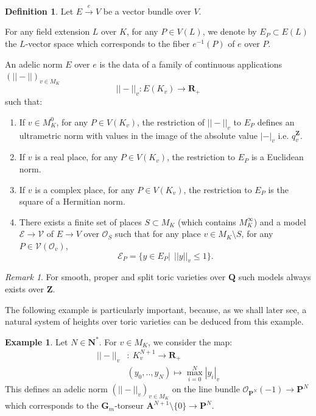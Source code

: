 \documentclass{proc-l}
\newcommand{\R}{\mathbf{R}}
\newcommand{\Z}{\mathbf{Z}}
\newcommand{\Proj}{\mathbf{P}}
\newcommand{\N}{\mathbf{N}}
\newcommand{\Q}{\mathbf{Q}}
\newcommand{\G}{\mathbf{G}}
\newcommand{\affine}{\mathbf{A}}
\newcommand{\sheafO}{\mathcal{O}}
\theoremstyle{definition}
\newtheorem{definition}[theorem]{Definition}
\newtheorem{example}[theorem]{Example}
\theoremstyle{remark}
\newtheorem{remark}[theorem]{Remark}
\numberwithin{equation}{section}
\begin{document}
\begin{definition}
    Let $E \xrightarrow{e} V$ be a vector bundle over $V$.

   For any field extension $L$ over $K$, for any $P \in V(L)$, we denote by $E_P \subset E(L)$ the $L$-vector space which corresponds to the fiber $e^{-1}(P)$ of $e$ over $P$.
   
   An adelic norm $E$ over $e$ is the data of a family of continuous applications $(||-|| )_{v \in M_K}$ 
   $$ ||-||_v : E(K_v) \rightarrow \R_+$$
   such that:
\begin{enumerate}
    \item If $v \in M_K^0$, for any $P \in V(K_v)$, the restriction of $||-||_v$ to $E_P$ defines an ultrametric norm with values in the image of the absolute value $|-|_v$ i.e. $q_v^{\Z}$.

    \item If $v$ is a real place, for any $P \in V(K_v)$, the restriction to $E_P$ is a Euclidean norm.

    \item If $v$ is a complex place, for any $P \in V(K_v)$, the restriction to $E_P$ is the square of a Hermitian norm.

    \item There exists a finite set of places $S \subset M_K$ (which contains $M_K^{\infty}$) and a model $\mathcal{E} \rightarrow \mathcal{V}$ of $E \rightarrow V$ over $\sheafO_S$ such that for any place $v \in M_K \setminus S$, for any $P \in \mathcal{V}(\sheafO_v)$,
    $$ \mathcal{E}_P = \{ y \in E_P | \ \ ||y||_v \leqslant 1 \} .$$
    
\end{enumerate}

\end{definition}

\begin{remark}
    For smooth, proper and split toric varieties over $\Q$ such models always exists over $\Z$.
\end{remark}

The following example is particularly important, because, as we shall later see, a natural system of heights over toric varieties can be deduced from this example.

\begin{example}
    Let $N \in \N^*$. For $v \in M_K$, we consider the map:
    \begin{align*}
        ||-||_v &:  \ K_v^{N+1} \rightarrow \R_+ \\
        &(y_0,..,y_N) \longmapsto \max\limits_{i = 0}^N |y_i|_v
    \end{align*}
    This defines an adelic norm $(||-||_v)_{v \in M_K}$ on the line bundle $\sheafO_{\Proj^N}(-1) \rightarrow \Proj^N$ which corresponds to the $\G_m$-torseur $\affine^{N + 1} \setminus \{ 0 \} \rightarrow \Proj^N$.
\end{example}
\end{document}
